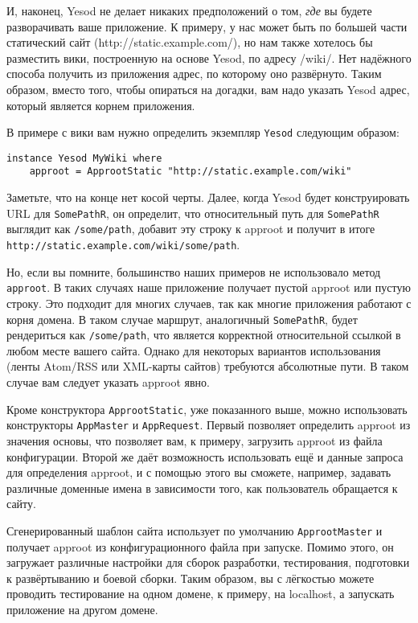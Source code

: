 И, наконец, Yesod не делает никаких предположений о том, \emph{где} вы будете
разворачивать ваше приложение. К примеру, у нас может быть по большей части
статический сайт (http://static.example.com/), но нам также хотелось бы
разместить вики, построенную на основе Yesod, по адресу /wiki/. Нет надёжного
способа получить из приложения адрес, по которому оно развёрнуто. Таким
образом, вместо того, чтобы опираться на догадки, вам надо указать Yesod адрес,
который является корнем приложения.

В примере с вики вам нужно определить экземпляр \lstinline!Yesod! следующим
образом:

\begin{lstlisting}
instance Yesod MyWiki where
    approot = ApprootStatic "http://static.example.com/wiki"
\end{lstlisting}

Заметьте, что на конце нет косой черты. Далее, когда Yesod будет конструировать
URL для \lstinline!SomePathR!, он определит, что относительный путь для
\lstinline!SomePathR! выглядит как \lstinline!/some/path!, добавит эту строку к
approot и получит в итоге \lstinline!http://static.example.com/wiki/some/path!.

Но, если вы помните, большинство наших примеров не использовало метод
\lstinline!approot!. В таких случаях наше приложение получает пустой approot
или пустую строку. Это подходит для многих случаев, так как многие приложения
работают с корня домена. В таком случае маршрут, аналогичный
\lstinline!SomePathR!, будет рендериться как \lstinline!/some/path!, что
является корректной относительной ссылкой в любом месте вашего сайта. Однако
для некоторых вариантов использования (ленты Atom/RSS или XML-карты сайтов)
требуются абсолютные пути. В таком случае вам следует указать approot явно.

Кроме конструктора \lstinline!ApprootStatic!, уже показанного выше, можно
использовать конструкторы \lstinline!AppMaster! и \lstinline!AppRequest!.
Первый позволяет определить approot из значения основы, что позволяет вам, к
примеру, загрузить approot из файла конфигурации. Второй же даёт возможность
использовать ещё и данные запроса для определения approot, и с помощью этого вы
сможете, например, задавать различные доменные имена в зависимости того, как
пользователь обращается к сайту.

Сгенерированный шаблон сайта использует по умолчанию \lstinline!ApprootMaster!
и получает approot из конфигурационного файла при запуске. Помимо этого, он
загружает различные настройки для сборок разработки, тестирования, подготовки к
развёртыванию и боевой сборки. Таким образом, вы с лёгкостью можете проводить
тестирование на одном домене, к примеру, на localhost, а запускать приложение
на другом домене.

